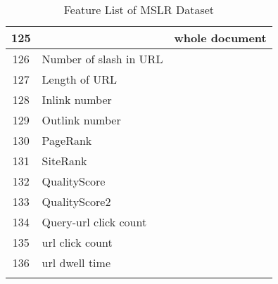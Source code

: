 \begin{longtable}{cll}
125        &                                                     & whole document \\
\midrule126        & Number of slash in URL                              &                \\
\midrule127        & Length of URL                                       &                \\
\midrule128        & Inlink number                                       &                \\
\midrule129        & Outlink number                                      &                \\
\midrule130        & PageRank                                            &                \\
\midrule131        & SiteRank                                            &                \\
\midrule132        & QualityScore                                        &                \\
\midrule133        & QualityScore2                                       &                \\
\midrule134        & Query-url click count                               &                \\
\midrule135        & url click count                                     &                \\
\midrule136        & url dwell time         \\                                  \toprule
\caption{Feature List of MSLR Dataset}\label{tab:features2}
\end{longtable}
